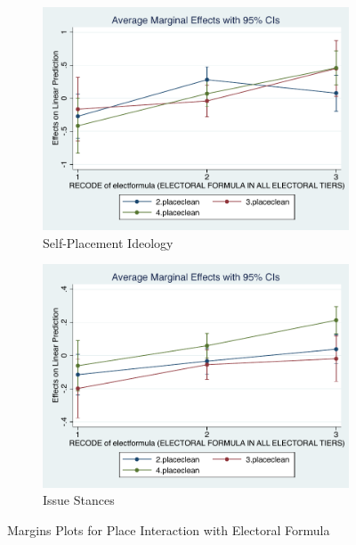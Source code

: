 \documentclass[12pt, titlepage]{article}
\begin{document}
\begin{figure}[H]
	\centering
	\begin{subfigure}[b]{0.475\textwidth}   
		\centering 
		\includegraphics[width=\textwidth]{Margins/IdeoPlaceFormula}
		\caption{Self-Placement Ideology}
	\end{subfigure}
	\hfill
	\begin{subfigure}[b]{0.475\textwidth}
		\centering 
		\includegraphics[width=\textwidth]{Margins/LibPlaceFormula}
		\caption{Issue Stances}
	\end{subfigure}
	\caption{Margins Plots for Place Interaction with Electoral Formula}
	\label{Elect}
\end{figure}
\end{document}

